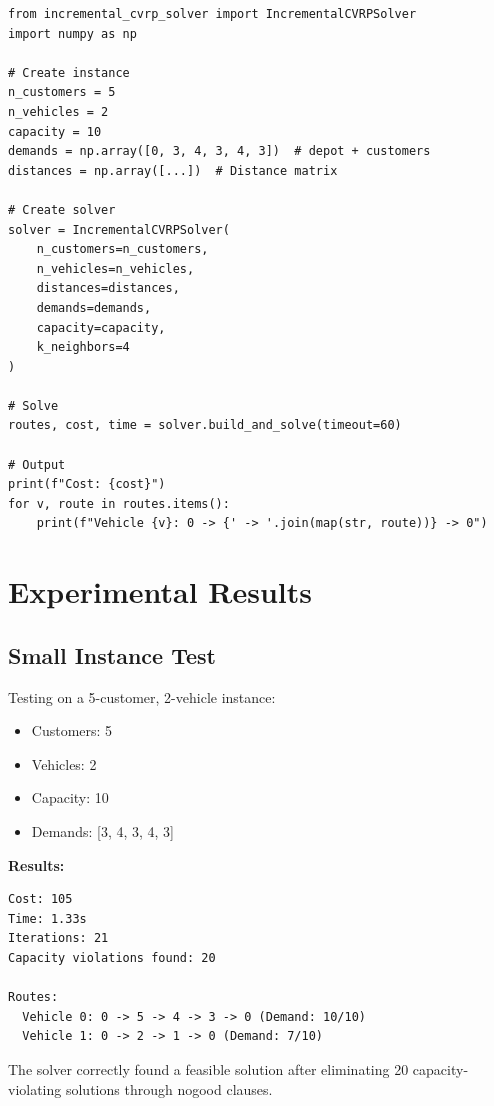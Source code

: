 \documentclass[12pt,a4paper]{article}
\theoremstyle{definition}
\begin{document}
\begin{lstlisting}[caption={Complete Usage Example}]
from incremental_cvrp_solver import IncrementalCVRPSolver
import numpy as np

# Create instance
n_customers = 5
n_vehicles = 2
capacity = 10
demands = np.array([0, 3, 4, 3, 4, 3])  # depot + customers
distances = np.array([...])  # Distance matrix

# Create solver
solver = IncrementalCVRPSolver(
    n_customers=n_customers,
    n_vehicles=n_vehicles,
    distances=distances,
    demands=demands,
    capacity=capacity,
    k_neighbors=4
)

# Solve
routes, cost, time = solver.build_and_solve(timeout=60)

# Output
print(f"Cost: {cost}")
for v, route in routes.items():
    print(f"Vehicle {v}: 0 -> {' -> '.join(map(str, route))} -> 0")
\end{lstlisting}

\section{Experimental Results}

\subsection{Small Instance Test}

Testing on a 5-customer, 2-vehicle instance:
\begin{itemize}
    \item Customers: 5
    \item Vehicles: 2
    \item Capacity: 10
    \item Demands: [3, 4, 3, 4, 3]
\end{itemize}

\textbf{Results:}
\begin{verbatim}
Cost: 105
Time: 1.33s
Iterations: 21
Capacity violations found: 20

Routes:
  Vehicle 0: 0 -> 5 -> 4 -> 3 -> 0 (Demand: 10/10)
  Vehicle 1: 0 -> 2 -> 1 -> 0 (Demand: 7/10)
\end{verbatim}

The solver correctly found a feasible solution after eliminating 20 capacity-violating solutions through nogood clauses.
\end{document}
